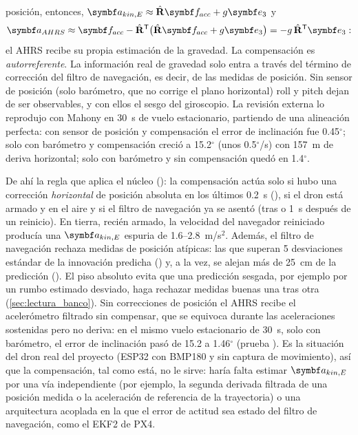 posición, entonces, $\vect a_{kin,E}\approx\hat\R\vect f_{acc}+g\eu$ y
\[
\vect a_{AHRS}\approx\vect f_{acc}-\hat\R\T\big(\hat\R\vect f_{acc}+g\eu\big)=-g\,\hat\R\T\eu :
\]
el AHRS recibe su propia estimación de la gravedad. La compensación es
\emph{autorreferente}. La información real de gravedad solo entra a través
del término de corrección del filtro de navegación, es decir, de las medidas
de posición. Sin sensor de posición (solo barómetro, que no corrige el plano
horizontal) roll y pitch dejan de ser observables, y con ellos el sesgo del
giroscopio. La revisión externa lo reprodujo con Mahony en 30~s de vuelo
estacionario, partiendo de una alineación perfecta: con sensor de posición y
compensación el error de inclinación fue 0.45$^\circ$; solo con barómetro y
compensación creció a 15.2$^\circ$ (unos 0.5$^\circ$/s) con 157~m de deriva
horizontal; solo con barómetro y sin compensación quedó en 1.4$^\circ$.

De ahí la regla que aplica el núcleo (): la
compensación actúa solo si hubo una corrección \emph{horizontal} de posición
absoluta en los últimos 0.2~s (), si el dron
está armado y en el aire y si el filtro de navegación ya se asentó (tras
 o 1~s después de un reinicio). En tierra, recién armado, la
velocidad del navegador reiniciado producía una $\vect a_{kin,E}$ espuria de
1.6--2.8~m/s$^2$. Además, el filtro de navegación rechaza medidas de
posición atípicas: las que superan 5 desviaciones estándar de la innovación
predicha () y, a la vez, se alejan más de 25~cm de la
predicción (). El piso absoluto evita que una predicción
sesgada, por ejemplo por un rumbo estimado desviado, haga rechazar medidas
buenas una tras otra (\cref{sec:lectura_banco}). Sin correcciones de posición el AHRS recibe el
acelerómetro filtrado sin compensar, que se equivoca durante las
aceleraciones sostenidas pero no deriva: en el mismo vuelo estacionario de
30~s, solo con barómetro, el error de inclinación pasó de 15.2 a
1.46$^\circ$ (prueba ). Es la situación del dron
real del proyecto (ESP32 con BMP180 y sin captura de movimiento), así que la
compensación, tal como está, no le sirve: haría falta estimar
$\vect a_{kin,E}$ por una vía independiente (por ejemplo, la segunda
derivada filtrada de una posición medida o la aceleración de referencia de
la trayectoria) o una arquitectura acoplada en la que el error de actitud sea
estado del filtro de navegación, como el EKF2 de PX4.

